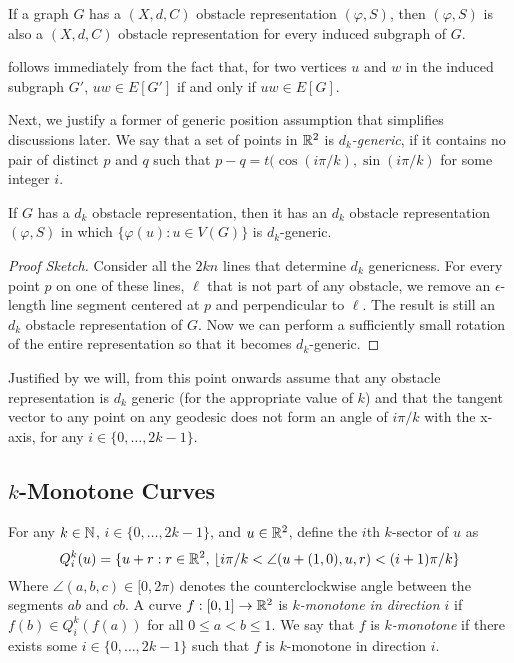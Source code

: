 \documentclass{patmorin}
\begin{document}
\begin{obs}
   If a graph $G$ has a $(X,d,C)$ obstacle representation
   $(\varphi,S)$, then   $(\varphi, S)$ is also a $(X,d,C)$ obstacle
   representation for every induced subgraph of $G$.
\end{obs}

 follows immediately from the fact that, for two vertices
$u$ and $w$ in the induced subgraph $G'$, $uw\in E[G']$ if and only if
$uw\in E[G]$.

Next, we justify a former of generic position assumption that
simplifies discussions later.  We say that a set of points in $\mathbb{R}^2$
is \emph{$d_k$-generic}, if it contains no pair of distinct $p$ and $q$
such that $p-q= t(\cos(i\pi/k),\sin(i\pi/k)$ for some integer $i$.

\begin{obs}
  If $G$ has a $d_k$ obstacle representation, then it
  has an $d_k$ obstacle representation $(\varphi, S)$
  in which $\{\varphi(u):u\in V(G)\}$ is $d_k$-generic.
\end{obs}

\begin{proof}[Proof Sketch]
   Consider all the $2kn$ lines that determine $d_k$ genericness.
   For every point $p$ on one of these lines, $\ell$ that is not
   part of any obstacle, we remove an $\epsilon$-length line segment
   centered at $p$ and perpendicular to $\ell$. The result is still
   an $d_k$ obstacle representation of $G$.  Now we can
   perform a sufficiently small rotation of the entire representation
   so that it becomes $d_k$-generic.
\end{proof}

Justified by  we will, from this point onwards
assume that any obstacle representation is $d_k$ generic (for the
appropriate value of $k$) and that the tangent vector to any point on
any geodesic does not form an angle of $i\pi/k$ with the x-axis, for
any $i\in\{0,\ldots,2k-1\}$.

\subsection{$k$-Monotone Curves}

For any $k\in\mathbb{N}$, $i\in\{0,\ldots,2k-1\}$, and $u\in\mathbb{R}^2$, define the
$i$th $k$-sector of $u$ as
\[
   Q^{k}_i(u) = 
     \{ u+r: r\in\mathbb{R}^2,\,\lfloor i\pi/k < \angle(u+(1,0),u,r) < (i+1)\pi/k \}
\]
Where $\angle (a,b,c)\in[0,2\pi)$ denotes the counterclockwise angle
between the segments $ab$ and $cb$.  A curve $f:[0,1]\to\mathbb{R}^2$ is
\emph{$k$-monotone in direction $i$} if $f(b)\in Q^k_i(f(a))$ for all
$0 \le a < b \le 1$.  We say that $f$ is \emph{$k$-monotone} if there
exists some $i\in\{0,\ldots,2k-1\}$ such that $f$ is $k$-monotone in
direction $i$.  
\end{document}

